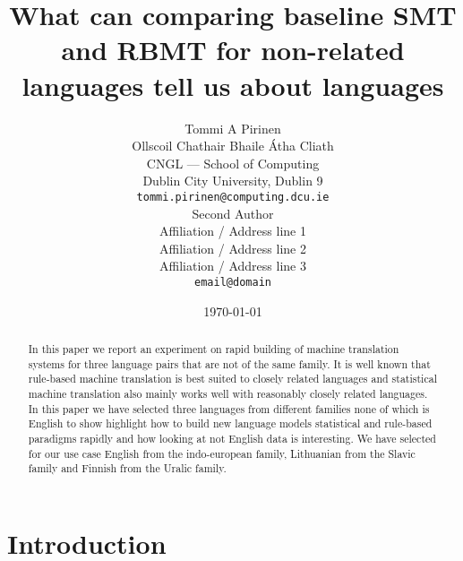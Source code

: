 \documentclass[11pt]{article}
\title{What can comparing baseline SMT and RBMT for non-related languages tell us about languages}
\author{Tommi A Pirinen \\
  Ollscoil Chathair Bhaile Átha Cliath \\
  CNGL --- School of Computing \\
  Dublin City University, Dublin 9 \\
  {\tt tommi.pirinen@computing.dcu.ie} \\\And
  Second Author \\
  Affiliation / Address line 1 \\
  Affiliation / Address line 2 \\
  Affiliation / Address line 3 \\
  {\tt email@domain} \\}
\date{\today}
\begin{document}
\maketitle
\begin{abstract}
  In this paper we report an experiment on rapid building of machine
  translation systems for three language pairs that are not of the same
  family. It is well known that rule-based machine translation is best
  suited to closely related languages and statistical machine translation
  also mainly works well with reasonably closely related languages. In this
  paper we have selected three languages from different families none of
  which is English to show highlight how to build new language models statistical
  and rule-based paradigms rapidly and how looking at not English data is
  interesting. We have selected for our use case English from the
  indo-european family, Lithuanian from the Slavic family and Finnish from
  the Uralic family. 
\end{abstract}

\section{Introduction}






\end{document}
